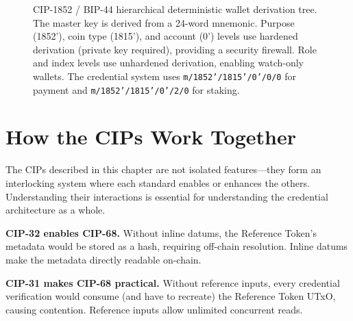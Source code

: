 \begin{figure}[ht]
\caption{CIP-1852 / BIP-44 hierarchical deterministic wallet derivation tree.
The master key is derived from a 24-word mnemonic.  Purpose (1852'),
coin type (1815'), and account (0') levels use hardened derivation (private
key required), providing a security firewall.  Role and index levels use
unhardened derivation, enabling watch-only wallets.  The credential system
uses \texttt{m/1852'/1815'/0'/0/0} for payment and
\texttt{m/1852'/1815'/0'/2/0} for staking.}
\label{fig:cip1852-derivation}
\end{figure}


\section{How the CIPs Work Together}
\label{sec:cips-together}

The CIPs described in this chapter are not isolated features---they form an
interlocking system where each standard enables or enhances the others.
Understanding their interactions is essential for understanding the
credential architecture as a whole.

\textbf{CIP-32 enables CIP-68.}  Without inline datums, the Reference
Token's metadata would be stored as a hash, requiring off-chain resolution.
Inline datums make the metadata directly readable on-chain.

\textbf{CIP-31 makes CIP-68 practical.}  Without reference inputs, every
credential verification would consume (and have to recreate) the Reference
Token UTxO, causing contention.  Reference inputs allow unlimited concurrent
reads.

